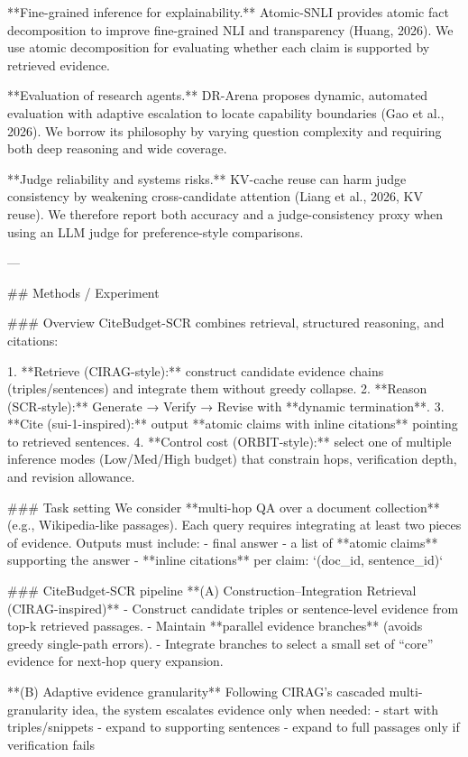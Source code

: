 **Fine-grained inference for explainability.** Atomic-SNLI provides atomic fact decomposition to improve fine-grained NLI and transparency (Huang, 2026). We use atomic decomposition for evaluating whether each claim is supported by retrieved evidence.  

**Evaluation of research agents.** DR-Arena proposes dynamic, automated evaluation with adaptive escalation to locate capability boundaries (Gao et al., 2026). We borrow its philosophy by varying question complexity and requiring both deep reasoning and wide coverage.  

**Judge reliability and systems risks.** KV-cache reuse can harm judge consistency by weakening cross-candidate attention (Liang et al., 2026, KV reuse). We therefore report both accuracy and a judge-consistency proxy when using an LLM judge for preference-style comparisons.

---

## Methods / Experiment  

### Overview  
CiteBudget-SCR combines retrieval, structured reasoning, and citations:

1. **Retrieve (CIRAG-style):** construct candidate evidence chains (triples/sentences) and integrate them without greedy collapse.  
2. **Reason (SCR-style):** Generate → Verify → Revise with **dynamic termination**.  
3. **Cite (sui-1-inspired):** output **atomic claims with inline citations** pointing to retrieved sentences.  
4. **Control cost (ORBIT-style):** select one of multiple inference modes (Low/Med/High budget) that constrain hops, verification depth, and revision allowance.

### Task setting  
We consider **multi-hop QA over a document collection** (e.g., Wikipedia-like passages). Each query requires integrating at least two pieces of evidence. Outputs must include:  
- final answer  
- a list of **atomic claims** supporting the answer  
- **inline citations** per claim: `(doc_id, sentence_id)`  

### CiteBudget-SCR pipeline  
**(A) Construction–Integration Retrieval (CIRAG-inspired)**  
- Construct candidate triples or sentence-level evidence from top-k retrieved passages.  
- Maintain **parallel evidence branches** (avoids greedy single-path errors).  
- Integrate branches to select a small set of “core” evidence for next-hop query expansion.

**(B) Adaptive evidence granularity**  
Following CIRAG’s cascaded multi-granularity idea, the system escalates evidence only when needed:  
- start with triples/snippets  
- expand to supporting sentences  
- expand to full passages only if verification fails

